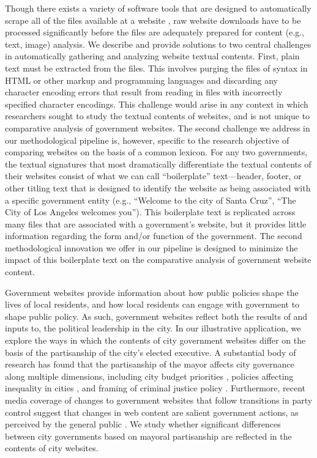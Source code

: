 \documentclass[11pt]{article}
\begin{document}
Though there exists a variety of software tools that are designed to automatically scrape all of the files available at a website \citep{glez2013web}, raw website downloads have to be processed significantly before the files are adequately prepared for content (e.g., text, image) analysis. We describe and provide solutions to two central challenges in automatically gathering and analyzing website textual contents. First, plain text must be extracted from the files. This involves purging the files of syntax in HTML or other markup and programming languages and discarding any character encoding errors that result from reading in files with incorrectly specified character encodings. This challenge would arise in any context in which researchers sought to study the textual contents of websites, and is not unique to comparative analysis of government websites. The second challenge we address in our methodological pipeline is, however, specific to the research objective of comparing websites on the basis of a common lexicon. For any two governments, the textual signatures that most dramatically differentiate the textual contents of their websites consist of what we can call ``boilerplate'' text---header, footer, or other titling text that is designed to identify the website as being associated with a specific government entity (e.g., ``Welcome to the city of Santa Cruz'', ``The City of Los Angeles welcomes you''). This boilerplate text is replicated across many files that are associated with a government's website, but it provides little information regarding the form and/or function of the government. The second methodological innovation we offer in our pipeline is designed to minimize the impact of this boilerplate text on the comparative analysis of government website content. 

Government websites provide information about how public policies shape the lives of local residents, and how local residents can engage with government to shape public policy. As such, government websites reflect both the results of and inputs to, the political leadership in the city. In our illustrative application, we explore the ways in which the contents of city government websites differ on the basis of the partisanship of the city's elected executive. A substantial body of research has found that the partisanship of the mayor affects city governance along multiple dimensions, including city budget priorities \citep{de2016mayoral}, policies affecting inequality in cities \citep{einstein2016mayors}, and framing of criminal justice policy \citep{marion2013mayor}. Furthermore, recent media coverage of changes to government websites that follow transitions in party control suggest that changes in web content are salient government actions, as perceived by the general public \citep{sharfstein2017science,kirby2017trump,duarte2017deniable}. We study whether significant differences between city governments based on mayoral partisanship are reflected in the contents of city websites.
\end{document}
